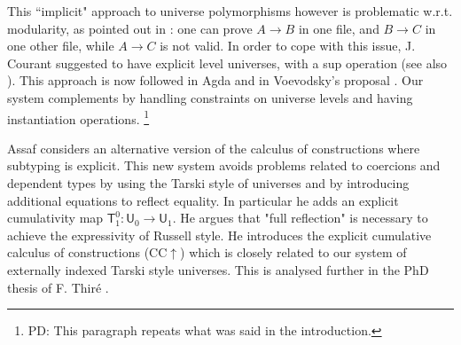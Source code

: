 \documentclass[11pt,a4paper]{article}
\theoremstyle{definition}
\newcommand{\UU}{\mathsf{U}}
\newcommand{\T}{\mathsf{T}}
\begin{document}
This ``implicit"
approach to universe polymorphisms however is problematic w.r.t. modularity, as pointed
out in \cite{Courant02,Simpson04}:
one can prove $A\rightarrow B$ in one file, and $B\rightarrow C$ in one other file, while
$A\rightarrow C$ is not valid. In order to cope with this issue, J. Courant \cite{Courant02}
suggested to have explicit level universes, with a sup operation (see also \cite{herbelin05}).
This approach is now followed in Agda and in Voevodsky's proposal \cite{VV}. Our system complements
\cite{Courant02,VV} by handling constraints on universe levels and having instantiation operations.
\footnote{PD: This paragraph repeats what was said in the introduction.}


Assaf \cite{Assaf14} considers an alternative version of the calculus of
constructions where subtyping is explicit. This new system avoids problems related to coercions and dependent types by using the Tarski style
of universes and by introducing additional equations to reflect equality. In particular he adds an explicit cumulativity map $\T^0_1 : \UU_0 \to \UU_1$. He argues that "full reflection" is necessary to achieve the expressivity of Russell style. He introduces the explicit cumulative calculus of constructions (CC$\uparrow$) which is closely related to our system of externally indexed Tarski style universes.
This is analysed further in the PhD thesis of F. Thir\'e \cite{Thire20}.
\end{document}

